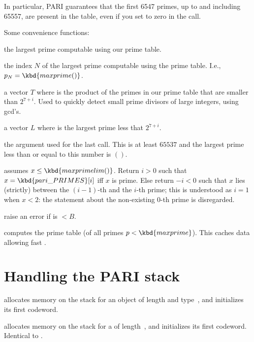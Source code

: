 In particular, PARI guarantees that the first 6547 primes, up to and
including 65557, are present in the table, even if you set  to
zero in the  call.

\noindent Some convenience functions:

 the largest prime computable using our prime table.

 the index $N$ of the largest prime computable using
the prime table. I.e., $p_N = \kbd{maxprime()}$.

 a vector $T$ where  is the product of the
primes in our prime table that are smaller than $2^{7+i}$. Used to quickly
detect small prime divisors of large integers, using gcd's.

 a vector $L$ where  is the largest
prime less that $2^{7+i}$.

 the argument used for the last
call. This is at least $65537$ and the largest prime
less than or equal to this number is $()$.

 assumes $x \leq \kbd{maxprimelim()}$. Return
$i > 0$ such that $x = \kbd{pari\_PRIMES}[i]$ iff $x$ is prime. Else
return $-i < 0$ such that $x$ lies (strictly) between the $(i-1)$-th and
the $i$-th prime; this is understood as $i = 1$ when $x < 2$: the statement
about the non-existing $0$-th prime is disregarded.

 raise an error if  is $< B$.

 computes the prime table
 (of all primes $p < \kbd{maxprime}$).
This caches data allowing fast .

\section{Handling the PARI stack}


 allocates memory on the stack for
an object of length  and type~, and initializes its first
codeword.

 allocates memory on the stack for a 
of length~, and initializes its first codeword. Identical to
.

